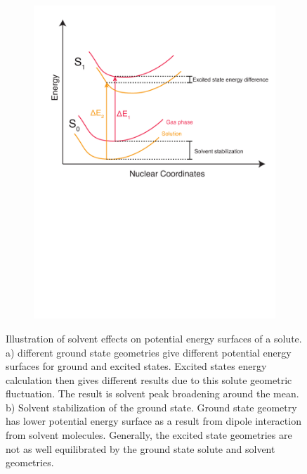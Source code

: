 \documentclass[
journal=jpcbfk, %
manuscript=article]{achemso}
\begin{document}
\begin{figure}[!tbp]
\begin{subfigure}[b]{0.48\textwidth}
			\includegraphics[width=1\textwidth]{images/PES2.pdf}
			\caption{}
			\label{fig:PESb)}
		\end{subfigure}
		\caption{Illustration of solvent effects on potential energy surfaces of a solute. a) different ground state geometries give different potential energy surfaces for ground and excited states. Excited states energy calculation then gives different results due to this solute geometric fluctuation. The result is solvent peak broadening around the mean. b) Solvent stabilization of the ground state. Ground state geometry has lower potential energy surface as a result from dipole interaction from solvent molecules. Generally, the excited state geometries are not as well equilibrated by the ground state solute and solvent geometries.}	
	\end{figure}
\end{document}
